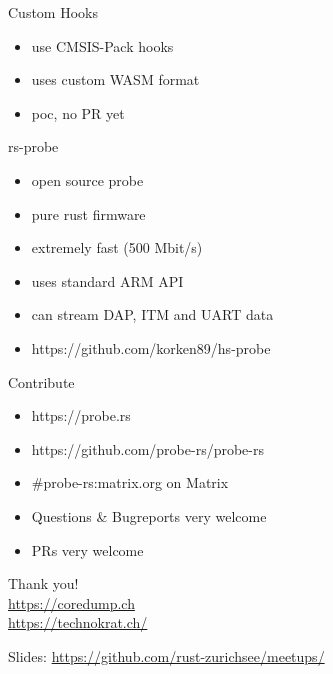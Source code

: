\documentclass[aspectratio=1610,14pt,t]{beamer}
\begin{document}
\begin{frame}[c,fragile]{Custom Hooks}
  \begin{itemize}
    \item use CMSIS-Pack hooks
    \item uses custom WASM format
    \item poc, no PR yet
  \end{itemize}
\end{frame}

\begin{frame}[c,fragile]{rs-probe}
  \begin{itemize}
    \item open source probe
    \item pure rust firmware
    \item extremely fast (500 Mbit/s)
    \item uses standard ARM API
    \item can stream DAP, ITM and UART data
    \item https://github.com/korken89/hs-probe
  \end{itemize}
\end{frame}

\begin{frame}[c]{Contribute}
  \begin{itemize}
    \item https://probe.rs
    \item https://github.com/probe-rs/probe-rs
    \item \#probe-rs:matrix.org on Matrix
    \item Questions \& Bugreports very welcome
    \item PRs very welcome
  \end{itemize}
\end{frame}


{
\begin{frame}[standout]
  \begin{centering}
    {\Huge Thank you!}\\
    {\normalsize \url{https://coredump.ch}}\\
    {\normalsize \url{https://technokrat.ch/}}\\
  \end{centering}
  {\small Slides: \url{https://github.com/rust-zurichsee/meetups/}}\\
  \vspace{3cm}
\end{frame}
}
\end{document}
